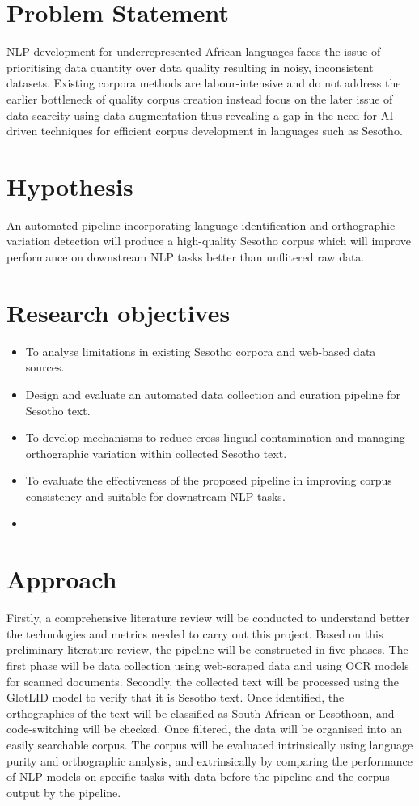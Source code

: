 \documentclass[11pt,a4paper]{article}
\begin{document}
\section{Problem Statement}
NLP development for underrepresented African languages faces the issue of prioritising data quantity over data quality resulting in noisy, inconsistent datasets. Existing corpora methods are labour-intensive and do not address the earlier bottleneck of quality corpus creation instead focus on the later issue of data scarcity using data augmentation thus revealing a gap in the need for AI-driven techniques for efficient corpus development in languages such as Sesotho.

\section{Hypothesis}
An automated pipeline incorporating language identification and orthographic variation detection will produce a high-quality Sesotho corpus which will improve performance on downstream NLP tasks better than unflitered raw data.

\section{Research objectives}
\begin{itemize}
        \item  To analyse limitations in existing Sesotho corpora and web-based data sources.
       \item Design and evaluate an automated data collection and curation pipeline for Sesotho text.
       \item To develop mechanisms to reduce cross-lingual contamination and managing orthographic variation within collected Sesotho text.
       \item To evaluate the effectiveness of the proposed pipeline in improving corpus consistency and suitable for downstream NLP tasks. 
       \item 
\end{itemize}
\vspace{2em}
\section{Approach}
Firstly, a comprehensive literature review will be conducted to understand better the technologies and metrics needed to carry out this project. Based on this preliminary literature review, the pipeline will be constructed in five phases. The first phase will be data collection using web-scraped data and using OCR models for scanned documents. Secondly, the collected text will be processed using the GlotLID model to verify that it is Sesotho text. Once identified, the orthographies of the text will be classified as South African or Lesothoan, and code-switching will be checked. Once filtered, the data will be organised into an easily searchable corpus. The corpus will be evaluated intrinsically using language purity and orthographic analysis, and extrinsically by comparing the performance of NLP models on specific tasks with data before the pipeline and the corpus output by the pipeline.
\end{document}
